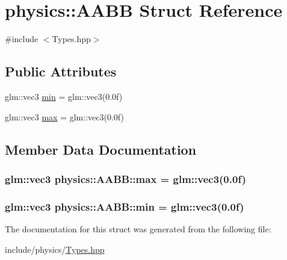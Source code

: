 \hypertarget{structphysics_1_1AABB}{\section{physics\-:\-:A\-A\-B\-B Struct Reference}
\label{structphysics_1_1AABB}
}


{\ttfamily \#include $<$Types.\-hpp$>$}

\subsection*{Public Attributes}
\begin{DoxyCompactItemize}
\item 
glm\-::vec3 \hyperlink{structphysics_1_1AABB_a16c5e0302219c677543716213f3a7e48}{min} = glm\-::vec3(0.\-0f)
\item 
glm\-::vec3 \hyperlink{structphysics_1_1AABB_aef0e2365bb7155817310c15cc9c216c4}{max} = glm\-::vec3(0.\-0f)
\end{DoxyCompactItemize}


\subsection{Member Data Documentation}
\hypertarget{structphysics_1_1AABB_aef0e2365bb7155817310c15cc9c216c4}{
\subsubsection[{max}]{\setlength{\rightskip}{0pt plus 5cm}glm\-::vec3 physics\-::\-A\-A\-B\-B\-::max = glm\-::vec3(0.\-0f)}}\label{structphysics_1_1AABB_aef0e2365bb7155817310c15cc9c216c4}
\hypertarget{structphysics_1_1AABB_a16c5e0302219c677543716213f3a7e48}{
\subsubsection[{min}]{\setlength{\rightskip}{0pt plus 5cm}glm\-::vec3 physics\-::\-A\-A\-B\-B\-::min = glm\-::vec3(0.\-0f)}}\label{structphysics_1_1AABB_a16c5e0302219c677543716213f3a7e48}


The documentation for this struct was generated from the following file\-:\begin{DoxyCompactItemize}
\item 
include/physics/\hyperlink{Types_8hpp}{Types.\-hpp}\end{DoxyCompactItemize}
